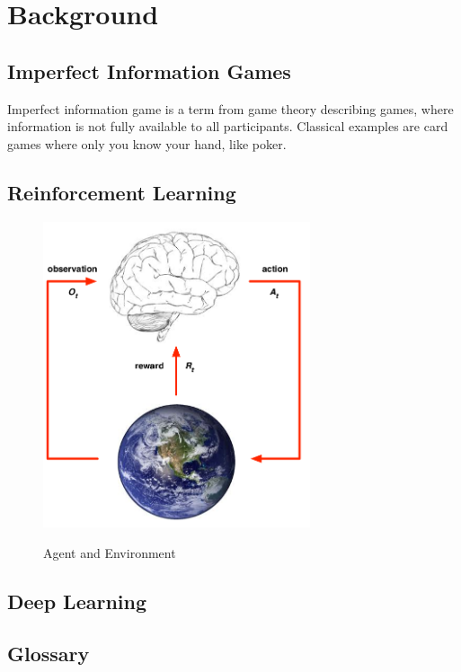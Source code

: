 \section{Background}

\subsection{Imperfect Information Games}

Imperfect information game is a term from game theory describing games, where information is not fully available to all participants. Classical examples are card games where only you know your hand, like poker.


\subsection{Reinforcement Learning}

\begin{figure}
	\centering
	\includegraphics[width=0.7\textwidth]{image/rl_agent_environment}
	\label{img:rl_agent}
	\caption{Agent and Environment\cite{pres:rl_learn}}
\end{figure}



\subsection{Deep Learning}\label{sec:deep_learn}


\subsection{Glossary}

